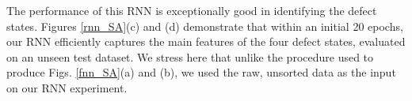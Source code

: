 The performance of this RNN is exceptionally good in identifying the defect states. Figures \ref{rnn_SA}(c) and (d) demonstrate that within an initial 20 epochs, our RNN efficiently captures the main features of the four defect states, evaluated on an unseen test dataset. We stress here that unlike the procedure used to produce Figs. \ref{fnn_SA}(a) and (b), we used the raw, unsorted data as the input on our RNN experiment.



